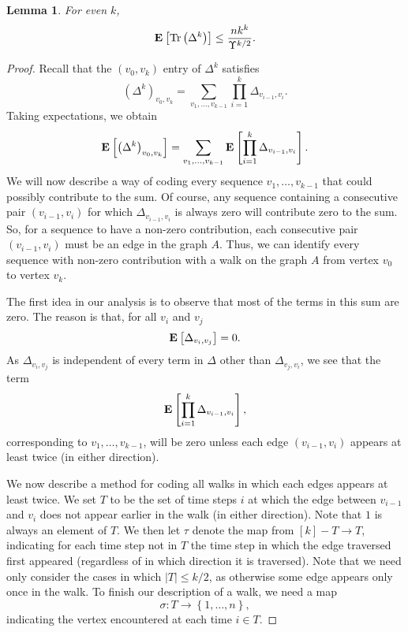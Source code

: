 \documentclass[11pt]{article}
\newtheorem{lemma}[theorem]{Lemma}
\def\vs#1#2#3{#1_{#2},\ldots , #1_{#3}}
\def\trace#1{\mathrm{Tr} \left(#1 \right)}
\def\expec#1#2{\mbox{\bf E}_{#1}\left[ #2 \right]}
\def\setof#1{\left\{#1  \right\}}
\def\sizeof#1{\left|#1  \right|}
\def\setof#1{\left\{#1  \right\}}
\begin{document}
\begin{lemma}\label{lem:trace}
For even $k$,
\[
\expec{}{\trace{\Delta^{k}}}
\leq
\frac{n k^{k}}{\Upsilon^{k/2}}.
\]
\end{lemma}
\begin{proof}
Recall that the $(v_{0}, v_{k})$ entry of $\Delta^{k}$ satisfies
\[
\left(\Delta^{k} \right)_{v_{0}, v_{k}}
=
\sum_{\vs{v}{1}{k-1}} \prod_{i=1}^{k} \Delta_{v_{i-1}, v_{i}}.
\]
Taking expectations, we obtain
\begin{equation}\label{eqn:deltaExpec}
\expec{}{\left(\Delta^{k} \right)_{v_{0}, v_{k}}}
=
\sum_{\vs{v}{1}{k-1}}
\expec{}{\prod_{i=1}^{k} \Delta_{v_{i-1}, v_{i}}}.
\end{equation}
We will now describe a way of coding every sequence
  $v_{1}, \dotsc , v_{k-1}$
  that could
  possibly contribute to the sum.
Of course, any sequence containing a consecutive pair
  $(v_{i-1}, v_{i})$ for
  which $\Delta _{v_{i-1}, v_{i}}$ is always zero
  will contribute zero to the sum.
So, for a sequence to have a non-zero contribution, each
  consecutive pair $(v_{i-1}, v_{i})$ must be an edge in the graph $A$.
Thus, we can identify every sequence with non-zero contribution with a walk
  on the graph $A$ from vertex $v_{0}$ to vertex $v_{k}$.


The first idea in our analysis is to observe that most of the
  terms in this sum are zero.
The reason is that, for all $v_{i}$ and $v_{j}$
\[
\expec{}{\Delta_{v_{i},v_{j}}}
 = 0.
\]
As $\Delta _{v_{i}, v_{j}}$ is independent of every
  term in $\Delta $ other than $\Delta _{v_{j}, v_{i}}$,
  we see that the term
\begin{equation}\label{eqn:deltaTerm}
\expec{}{\prod_{i=1}^{k} \Delta_{v_{i-1}, v_{i}}},
\end{equation}
corresponding to
  $v_{1}, \dotsc , v_{k-1}$, will be zero
  unless each edge $(v_{i-1}, v_{i})$ appears at least
  twice (in either direction).


We now describe a method for coding all walks
  in which each edges appears at least twice.
We set $T$ to be the set of time steps $i$
  at which the edge between $v_{i-1}$ and $v_{i}$
  does not appear earlier in the walk (in either direction).
Note that $1$ is always an element of $T$.
We then let $\tau $ denote the map from
  $[k] - T \rightarrow T$, indicating for each
  time step not in $T$ the time step in which
  the edge traversed first appeared (regardless of
  in which direction it is traversed).
Note that we need only consider the cases in which $\sizeof{T} \leq k/2$, as
  otherwise some edge appears only once in the walk.
To finish our description of a walk, we need
  a map
\[
  \sigma : T \rightarrow \setof{1,\dotsc ,n},
\]
indicating the vertex encountered at each time $i \in T$.


\end{proof}
\end{document}
